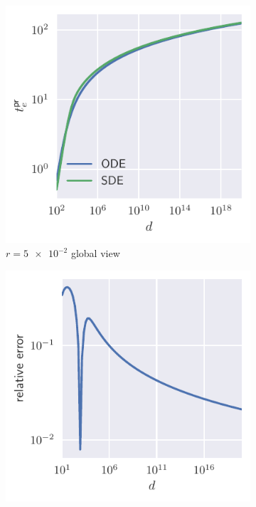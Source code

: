 \begin{figure}
  \centering
  \begin{subfigure}{0.495\textwidth}
    \includegraphics[width=1.\textwidth]{figures/sde/ode_vs_sde_r0.05.pdf}
    \caption{\(r=\num{5e-2}\) global view}
  \end{subfigure}
  \begin{subfigure}{0.495\textwidth}
    \includegraphics[width=1.\textwidth]{figures/sde/ode_vs_sde_relative_error.pdf}

\end{subfigure}
\end{figure}
